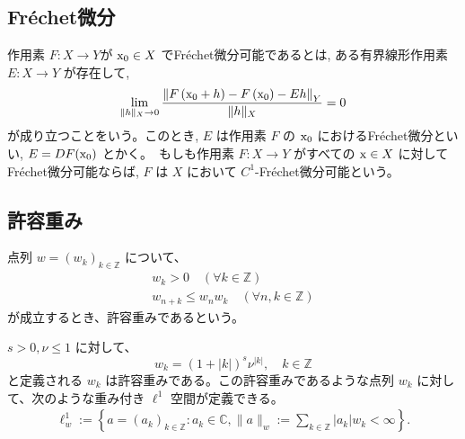 \subsection{Fréchet微分}
\begin{df}
作用素 $F:X\rightarrow Y$が $\mathrm x_0 \in X$ でFréchet微分可能であるとは, ある有界線形作用素 $E:X \rightarrow Y$ が存在して, 
$$
\lim _{\|h\|_{X} \rightarrow 0} \frac{\left\|F\left(\mathrm x_{0}+h\right) - F\left(\mathrm x_{0}\right)-E h\right\|_{Y}}{\|h\|_{X}}=0
$$
が成り立つことをいう。このとき, $E$ は作用素 $F$ の $\mathrm x_0$ におけるFréchet微分といい, $E=DF(\mathrm x_0)$ とかく。　もしも作用素 $F:X\rightarrow Y$ がすべての $\mathrm x\in X$ に対してFréchet微分可能ならば, $F$ は $X$ において $C^1$-Fréchet微分可能という。
\end{df}

\subsection{許容重み}

\begin{df}点列 $w = (w_k)_{k \in \mathbb{Z}}$ について、
\begin{align*}
    w_k > 0 \quad (\forall k \in \mathbb{Z}) \\
    w_{n+k} \leq w_n w_k \quad ( \forall n,k \in \mathbb{Z})
\end{align*}
が成立するとき、許容重みであるという。
\end{df}

\begin{example}
$s>0, \nu \leq 1$ に対して、
$$
    w_k = (1 + |k|)^s \nu^{|k|} , \quad k \in \mathbb{Z}
$$
と定義される $w_k$ は許容重みである。この許容重みであるような点列 $w_k$ に対して、次のような重み付き $\ell^1$ 空間が定義できる。
\footnotesize
\begin{align*}
     \ell^1_w := \left\{ a = (a_k)_{k \in \mathbb{Z}}: a_k \in \mathbb{C}, \| a \|_w := \sum_{k \in \mathbb{Z} }|a_k | w_k < \infty \right\}.
\end{align*}
\end{example}
\normalsize

